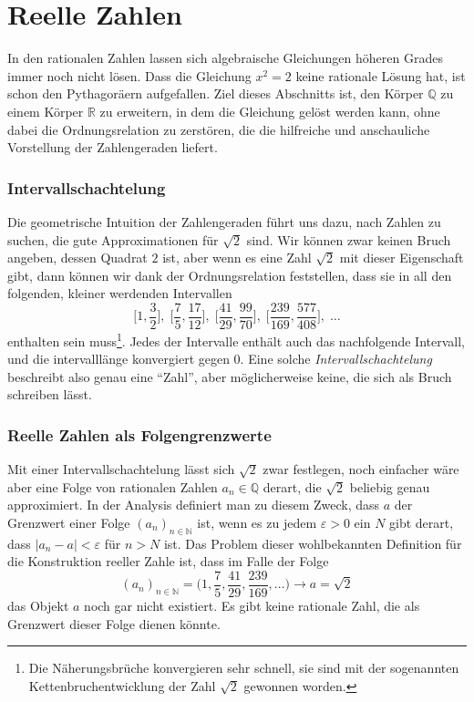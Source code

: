 %
%
%
\section{Reelle Zahlen
\label{buch:section:reelle-zahlen}}
In den rationalen Zahlen lassen sich algebraische Gleichungen höheren
Grades immer noch nicht lösen.
Dass die Gleichung $x^2=2$ keine rationale Lösung hat, ist schon den
Pythagoräern aufgefallen.
Ziel dieses Abschnitts ist, den Körper $\mathbb{Q}$ zu einem
Körper $\mathbb{R}$ zu erweitern, in dem die Gleichung
gelöst werden kann, ohne dabei die Ordnungsrelation zu zerstören, die
die hilfreiche und anschauliche Vorstellung der Zahlengeraden
liefert.
%

\subsubsection{Intervallschachtelung}
Die geometrische Intuition der Zahlengeraden führt uns dazu, nach
Zahlen zu suchen, die gute Approximationen für $\sqrt{2}$ sind.
Wir können zwar keinen Bruch angeben, dessen Quadrat $2$ ist, aber
wenn es eine Zahl $\sqrt{2}$ mit dieser Eigenschaft gibt, dann können
wir dank der Ordnungsrelation feststellen, dass sie in all den folgenden,
kleiner werdenden Intervallen
\[
\biggl[1,\frac32\biggr],\;
\biggl[\frac75,\frac{17}{12}\biggr],\;
\biggl[\frac{41}{29},\frac{99}{70}\biggr],\;
\biggl[\frac{239}{169},\frac{577}{408}\biggr],\;
\dots
\]
enthalten sein muss\footnote{Die Näherungsbrüche konvergieren sehr
schnell, sie sind mit der sogenannten Kettenbruchentwicklung der
Zahl $\sqrt{2}$ gewonnen worden.}.
Jedes der Intervalle enthält auch das nachfolgende Intervall, und
die intervalllänge konvergiert gegen 0.
Eine solche \emph{Intervallschachtelung} beschreibt also genau eine ``Zahl'',
%
aber möglicherweise keine, die sich als Bruch schreiben lässt.

\subsubsection{Reelle Zahlen als Folgengrenzwerte}
Mit einer Intervallschachtelung lässt sich $\sqrt{2}$ zwar festlegen,
noch einfacher wäre aber eine Folge von rationalen Zahlen $a_n\in\mathbb{Q}$
derart, die $\sqrt{2}$ beliebig genau approximiert.
In der Analysis definiert man zu diesem Zweck, dass $a$ der Grenzwert
einer Folge $(a_n)_{n\in\mathbb{N}}$ ist, wenn es zu jedem $\varepsilon > 0$
ein $N$ gibt derart, dass $|a_n-a|<\varepsilon$ für $n>N$ ist.
Das Problem dieser wohlbekannten Definition für die Konstruktion
reeller Zahle ist, dass im Falle der Folge
\[
(a_n)_{n\in\mathbb{N}}=
\biggl(1,
\frac75,
\frac{41}{29},
\frac{239}{169},\dots\biggr) \to a=\sqrt{2}
\]
das Objekt $a$ noch gar nicht existiert.
Es gibt keine rationale Zahl, die als Grenzwert dieser Folge dienen
könnte.

